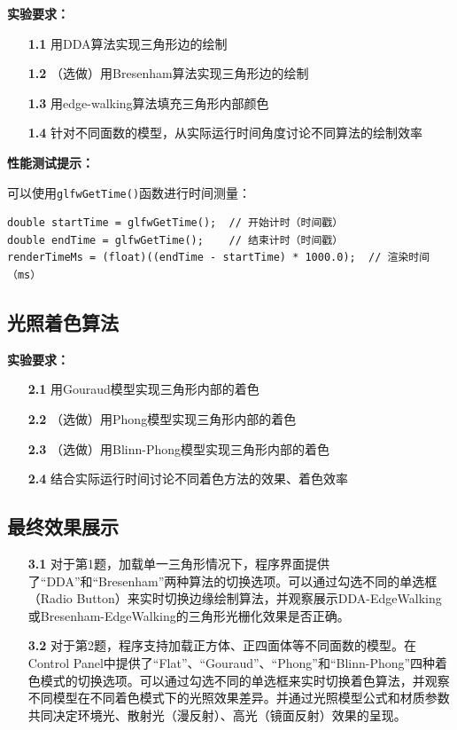\documentclass[a4paper]{article}
\begin{document}
\textbf{实验要求：}

\begin{enumerate}
\item[\textbf{1.1}] 用DDA算法实现三角形边的绘制
\item[\textbf{1.2}] （选做）用Bresenham算法实现三角形边的绘制  
\item[\textbf{1.3}] 用edge-walking算法填充三角形内部颜色
\item[\textbf{1.4}] 针对不同面数的模型，从实际运行时间角度讨论不同算法的绘制效率
\end{enumerate}

\textbf{性能测试提示：}

可以使用\texttt{glfwGetTime()}函数进行时间测量：
\begin{lstlisting}
double startTime = glfwGetTime();  // 开始计时（时间戳）
double endTime = glfwGetTime();    // 结束计时（时间戳）
renderTimeMs = (float)((endTime - startTime) * 1000.0);  // 渲染时间（ms）
\end{lstlisting}

\subsection{光照着色算法}

\textbf{实验要求：}

\begin{enumerate}
\item[\textbf{2.1}] 用Gouraud模型实现三角形内部的着色
\item[\textbf{2.2}] （选做）用Phong模型实现三角形内部的着色
\item[\textbf{2.3}] （选做）用Blinn-Phong模型实现三角形内部的着色  
\item[\textbf{2.4}] 结合实际运行时间讨论不同着色方法的效果、着色效率
\end{enumerate}

\subsection{最终效果展示}

\begin{enumerate}
\item[\textbf{3.1}] 对于第1题，加载单一三角形情况下，程序界面提供了“DDA”和“Bresenham”两种算法的切换选项。可以通过勾选不同的单选框（Radio Button）来实时切换边缘绘制算法，并观察展示DDA-EdgeWalking或Bresenham-EdgeWalking的三角形光栅化效果是否正确。

\item[\textbf{3.2}] 对于第2题，程序支持加载正方体、正四面体等不同面数的模型。在Control Panel中提供了“Flat”、“Gouraud”、“Phong”和“Blinn-Phong”四种着色模式的切换选项。可以通过勾选不同的单选框来实时切换着色算法，并观察不同模型在不同着色模式下的光照效果差异。并通过光照模型公式和材质参数共同决定环境光、散射光（漫反射）、高光（镜面反射）效果的呈现。
\end{enumerate}
\end{document}
